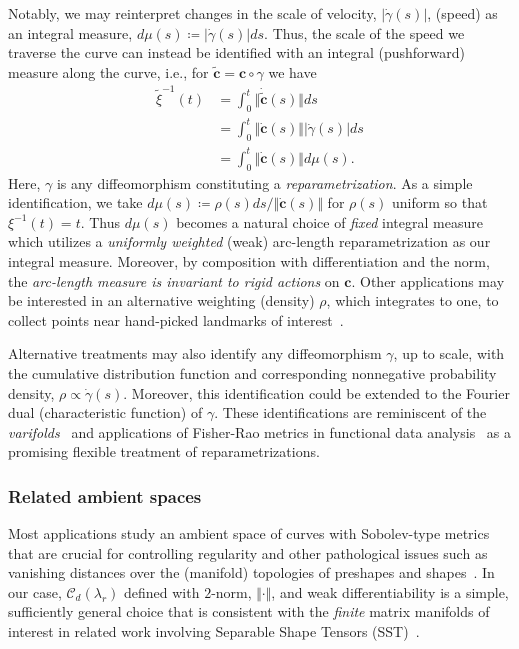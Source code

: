 \documentclass[pdflatex,iicol]{sn-jnl}%
\theoremstyle{thmstyleone}%
\theoremstyle{thmstyletwo}%
\theoremstyle{thmstylethree}%
\begin{document}
Notably, we may reinterpret changes in the scale of velocity, $\vert \dot{\gamma}(s) \vert$, (speed) as an integral measure, $d\mu(s) \coloneqq \vert \dot{\gamma}(s) \vert ds$. Thus, the scale of the speed we traverse the curve can instead be identified with an integral (pushforward) measure along the curve, i.e., for $\tilde{\boldsymbol{c}} = \boldsymbol{c}\circ \gamma$ we have
\begin{align}
    \tilde{\xi}^{-1}(t) &= \int_0^t \Vert \dot{\tilde{\boldsymbol{c}}}(s) \Vert ds \\ \nonumber
    & = \int_0^{t} \Vert \dot{\boldsymbol{c}}(s) \Vert\vert \dot{\gamma}(s) \vert ds \\ \nonumber
    & = \int_0^{t} \Vert \dot{\boldsymbol{c}}(s) \Vert d\mu(s). \nonumber
\end{align}
Here, $\gamma$ is any diffeomorphism constituting a \textit{reparametrization}. As a simple identification, we take $d\mu(s) \coloneqq \rho(s)ds/\Vert \dot{\boldsymbol{c}}(s)\Vert$ for $\rho(s)$ uniform so that $\xi^{-1}(t) = t$. Thus $d\mu(s)$ becomes a natural choice of \textit{fixed} integral measure which utilizes a \textit{uniformly weighted} (weak) arc-length reparametrization as our integral measure. Moreover, by composition with differentiation and the norm, the \textit{arc-length measure is invariant to rigid actions} on $\boldsymbol{c}$. Other applications may be interested in an alternative weighting (density) $\rho$, which integrates to one, to collect points near hand-picked landmarks of interest~\cite{Doronina2023, grey2023separable}.

Alternative treatments may also identify any diffeomorphism $\gamma$, up to scale, with the cumulative distribution function and corresponding nonnegative probability density, $\rho \propto \dot{\gamma}(s)$. Moreover, this identification could be extended to the Fourier dual (characteristic function) of $\gamma$. These identifications are reminiscent of the \textit{varifolds}~\cite{younes2008metric, charon2013varifold} and applications of Fisher-Rao metrics in functional data analysis~\cite{tucker2013generative, srivastava2016functional} as a promising flexible treatment of reparametrizations.

\subsubsection{Related ambient spaces}
Most applications study an ambient space of curves with Sobolev-type metrics that are crucial for controlling regularity and other pathological issues such as vanishing distances over the (manifold) topologies of preshapes and shapes~\cite{michor2004vanishing,bauer2014overview,micheli2013matrix}. In our case, $\mathcal{C}_d(\lambda_r)$ defined with $2$-norm, $\Vert \cdot \Vert$, and weak differentiability is a simple, sufficiently general choice that is consistent with the \textit{finite} matrix manifolds of interest in related work involving Separable Shape Tensors (SST)~\cite{grey2023separable}. 
\end{document}
